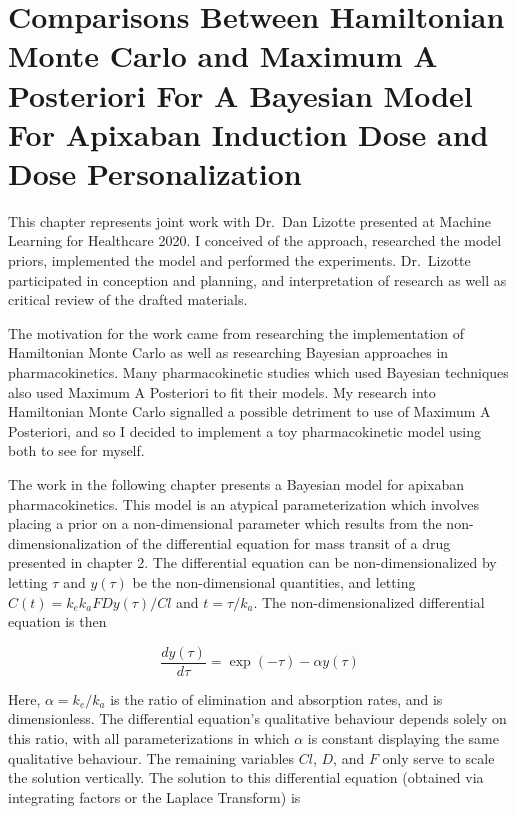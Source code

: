 \chapter[Comparisons Between HMC and MAP for Dose Personalization]{Comparisons Between Hamiltonian Monte Carlo and Maximum A Posteriori For A Bayesian Model For Apixaban Induction Dose and Dose Personalization}

This chapter represents joint work with Dr.\ Dan Lizotte presented at  Machine Learning for Healthcare 2020.  I conceived of the approach, researched the model priors, implemented the model and performed the experiments. Dr.\ Lizotte participated in conception and planning, and interpretation of research as well as critical review of the drafted materials.

The motivation for the work came from researching the implementation of Hamiltonian Monte Carlo as well as researching Bayesian approaches in pharmacokinetics.  Many pharmacokinetic studies which used Bayesian techniques also used Maximum A Posteriori to fit their models.  My research into Hamiltonian Monte Carlo signalled a possible detriment to use of Maximum A Posteriori, and so I decided to implement a toy pharmacokinetic model using both to see for myself.

The work in the following chapter presents a Bayesian model for apixaban pharmacokinetics.  This model is an atypical parameterization which involves placing a prior on a non-dimensional parameter which results from the non-dimensionalization of the differential equation for mass transit of a drug presented in chapter 2.  The differential equation can be non-dimensionalized by letting $\tau$ and $y(\tau)$ be the non-dimensional quantities, and letting $C(t) = k_ek_a FD y(\tau) / Cl$ and $t = \tau/k_a$.  The non-dimensionalized differential equation is then

\begin{equation}
	\dfrac{dy(\tau)}{d\tau} = \exp(-\tau) - \alpha y(\tau)
\end{equation}

\noindent Here, $\alpha = k_e / k_a$ is the ratio of elimination and absorption rates, and is dimensionless.  The differential equation's qualitative behaviour depends solely on this ratio, with all parameterizations in which $\alpha$ is constant displaying the same qualitative behaviour.  The remaining variables $Cl$, $D$, and $F$ only serve to scale the solution vertically.  The solution to this differential equation (obtained via integrating factors or the Laplace Transform) is


